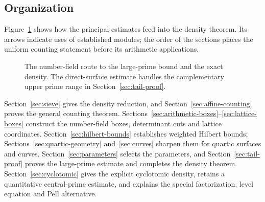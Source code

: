 \subsection{Organization}

Figure~\ref{fig:proof-flow} shows how the principal estimates feed
into the density theorem. Its arrows indicate uses of established
modules; the order of the sections places the uniform counting
statement before its arithmetic applications.

\begin{figure}[ht]
\centering

\caption{The number-field route to the large-prime bound and the
exact density. The direct-surface estimate handles the complementary
upper prime range in Section~\ref{sec:tail-proof}.}
\label{fig:proof-flow}
\end{figure}

Section~\ref{sec:sieve} gives the density reduction, and
Section~\ref{sec:affine-counting} proves the general counting theorem.
Sections~\ref{sec:arithmetic-boxes}--\ref{sec:lattice-boxes} construct
the number-field boxes, determinant cuts and lattice coordinates.
Section~\ref{sec:hilbert-bounds} establishes weighted Hilbert bounds;
Sections~\ref{sec:quartic-geometry} and~\ref{sec:curves} sharpen them
for quartic surfaces and curves. Section~\ref{sec:parameters} selects
the parameters, and Section~\ref{sec:tail-proof} proves the
large-prime estimate and completes the density theorem.
Section~\ref{sec:cyclotomic} gives the explicit cyclotomic density,
retains a quantitative central-prime estimate, and explains the
special factorization, level equation and Pell alternative.
